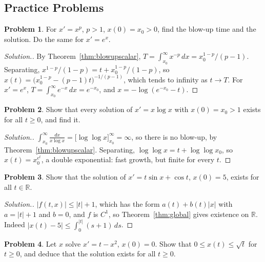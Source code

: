 \documentclass[11pt,a4paper]{article}
\numberwithin{equation}{section}
\theoremstyle{definition}
\newtheorem{problemx}{Problem}[subsection]
\newenvironment{problem}{\begin{problemx}}{\end{problemx}}
\newenvironment{solution}
  {\renewcommand{\qedsymbol}{}\begin{proof}[\textit{Solution}.]}
  {\end{proof}}
\begin{document}
\subsection{Practice Problems}

\begin{problem}
For $x' = x^p$, $p > 1$, $x(0) = x_0 > 0$, find the blow-up time and the solution. Do the same for $x' = e^x$.
\end{problem}

\begin{solution}
By Theorem~\ref{thm:blowupscalar}, $T = \int_{x_0}^\infty x^{-p}\,dx = x_0^{1-p}/(p - 1)$. Separating, $x^{1-p}/(1 - p) = t + x_0^{1-p}/(1 - p)$, so $x(t) = \bigl(x_0^{1-p} - (p - 1)t\bigr)^{-1/(p-1)}$, which tends to infinity as $t \to T$.
For $x' = e^x$, $T = \int_{x_0}^\infty e^{-x}\,dx = e^{-x_0}$, and $x = -\log(e^{-x_0} - t)$.
\end{solution}

\begin{problem}
Show that every solution of $x' = x\log x$ with $x(0) = x_0 > 1$ exists for all $t \geq 0$, and find it.
\end{problem}

\begin{solution}
$\int_{x_0}^\infty\frac{dx}{x\log x} = \bigl[\log\log x\bigr]_{x_0}^\infty = \infty$, so there is no blow-up, by Theorem~\ref{thm:blowupscalar}. Separating, $\log\log x = t + \log\log x_0$, so $x(t) = x_0^{e^t}$, a double exponential: fast
growth, but finite for every $t$.
\end{solution}

\begin{problem}
Show that the solution of $x' = t\sin x + \cos t$, $x(0) = 5$, exists for all $t \in \mathbb R$.
\end{problem}

\begin{solution}
$|f(t, x)| \leq |t| + 1$, which has the form $a(t) + b(t)|x|$ with $a = |t| + 1$ and $b = 0$, and $f$ is $C^1$, so Theorem~\ref{thm:global} gives existence on $\mathbb R$. Indeed $|x(t) - 5| \leq \int_0^{|t|}(s + 1)\,ds$.
\end{solution}

\begin{problem}
\label{prob:sqrtt}
Let $x$ solve $x' = t - x^2$, $x(0) = 0$. Show that $0 \leq x(t) \leq \sqrt t$ for $t \geq 0$, and deduce that the solution exists for all $t \geq 0$.
\end{problem}
\end{document}
